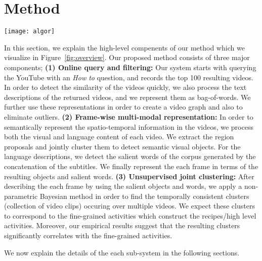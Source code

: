 \section{Method}
\label{sec:overview}
\begin{figure*}[t]
  \texttt{[image: algor]}
  \caption{Components of our recipe understanding method. \textbf{Query:} We query the YouTube for top 100 \emph{How To} videos and filter the outliers; \textbf{Framewise Representation:} We automatically extract object clusters and salient word in order to find multi-modal representation of each frame. \textbf{Unsupervised Activity Detection:} We jointly cluster videos in order to learn activities/steps related to the recipe.}
\label{fig:overview}
\end{figure*}

In this section, we explain the high-level compenents of our method which we visualize in Figure~\ref{fig:overview}. Our proposed method consists of three major components; \textbf{(1) Online query and filtering:} Our system starts with querying the YouTube with an \emph{How to} question, and records the top 100 resulting videos. In order to detect the similarity of the videos quickly, we also process the text descriptions of the returned videos, and we represent them as bag-of-words. We further use these representations in order to create a video graph and also to eliminate outliers. \textbf{(2) Frame-wise multi-modal representation:} In order to semantically represent the spatio-temporal information in the videos, we process both the visual and language content of each video. We extract the region proposals and jointly cluster them to detect semantic visual objects. For the language descriptions, we detect the salient words of the corpus generated by the concatenation of the subtitles. We finally represent the each frame in terms of the resulting objects and salient words. \textbf{(3) Unsupervised joint clustering:} After describing the each frame by using the salient objects and words, we apply a non-parametric Bayesian method in order to find the temporally consistent clusters (collection of video clips) occuring over multiple videos. We expect these clusters to correspond to the fine-grained activities which construct the recipes/high level activities. Moreover, our empirical results suggest that the resulting clusters significantly correlates with the fine-grained activities.

We now explain the details of the each sub-system in the following sections.
